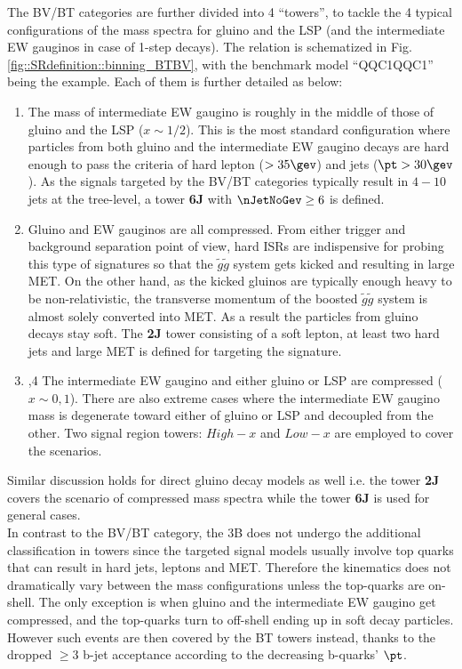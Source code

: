 \clearpage
The BV/BT categories are further divided into 4 ``towers'', to tackle the 4 typical configurations of the mass spectra for gluino and the LSP (and the intermediate EW gauginos in case of 1-step decays). The relation is schematized in Fig. \ref{fig::SRdefinition::binning_BTBV}, with the benchmark model ``QQC1QQC1'' being the example.
Each of them is further detailed as below:

\begin{enumerate}
\item The mass of intermediate EW gaugino is roughly in the middle of those of gluino and the LSP ($x \sim 1/2$).
This is the most standard configuration where particles from both gluino and the intermediate EW gaugino decays are hard enough to pass the criteria of hard lepton ($>35\gev$) and jets ($\pt>30\gev$). As the signals targeted by the BV/BT categories typically result in $4-10$ jets at the tree-level, a tower \textbf{6J} with $\nJetNoGev \geq 6$ is defined. 

\item Gluino and EW gauginos are all compressed. 
From either trigger and background separation point of view, hard ISRs are indispensive for probing this type of signatures so that the $\tilde{g}\tilde{g}$ system gets kicked and resulting in large MET. On the other hand, as the kicked gluinos are typically enough heavy to be non-relativistic, the transverse momentum of the boosted $\tilde{g}\tilde{g}$ system is almost solely converted into MET. As a result the particles from gluino decays stay soft. The \textbf{2J} tower consisting of a soft lepton, at least two hard jets and large MET is defined for targeting the signature.

\item,4 The intermediate EW gaugino and either gluino or LSP are compressed ($x \sim 0, 1$). 
There are also extreme cases where the intermediate EW gaugino mass is degenerate toward either of gluino or LSP and decoupled from the other. Two signal region towers: \textbf{$High-x$} and \textbf{$Low-x$} are employed to cover the scenarios. 
\end{enumerate}

Similar discussion holds for direct gluino decay models as well i.e. the tower \textbf{2J} covers the scenario of compressed mass spectra while the tower \textbf{6J} is used for general cases. \\

In contrast to the BV/BT category, the 3B does not undergo the additional classification in towers since the targeted signal models usually involve top quarks that can result in hard jets, leptons and MET. 
Therefore the kinematics does not dramatically vary between the mass configurations unless the top-quarks are on-shell.
The only exception is when gluino and the intermediate EW gaugino get compressed, and the top-quarks turn to off-shell ending up in soft decay particles.
However such events are then covered by the BT towers instead, thanks to the dropped $\geq 3$ b-jet acceptance according to the decreasing b-quarks' $\pt$. \\ 

